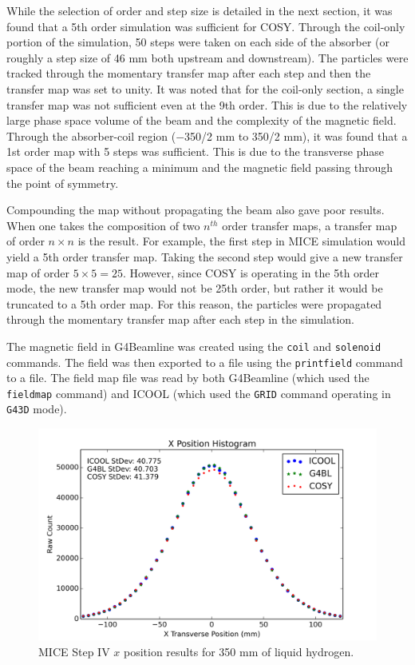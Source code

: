 While the selection of order and step size is detailed in the next section, it was found that a 5th order simulation was sufficient for COSY. Through the coil-only portion of the simulation, 50 steps were taken on each side of the absorber (or roughly a step size of 46 mm both upstream and downstream). The particles were tracked through the momentary transfer map after each step and then the transfer map was set to unity. It was noted that for the coil-only section, a single transfer map was not sufficient even at the 9th order. This is due to the relatively large phase space volume of the beam and the complexity of the magnetic field. Through the absorber-coil region ($-$350/2 mm to 350/2 mm), it was found that a 1st order map with 5 steps was sufficient. This is due to the transverse phase space of the beam reaching a minimum and the magnetic field passing through the point of symmetry.

Compounding the map without propagating the beam also gave poor results. When one takes the composition of two $n^{th}$ order transfer maps, a transfer map of order $n\times n$ is the result. For example, the first step in MICE simulation would yield a 5th order transfer map. Taking the second step would give a new transfer map of order $5\times 5 = 25$. However, since COSY is operating in the 5th order mode, the new transfer map would not be 25th order, but rather it would be truncated to a 5th order map. For this reason, the particles were propagated through the momentary transfer map after each step in the simulation.

The magnetic field in G4Beamline was created using the \texttt{coil} and \texttt{solenoid} commands. The field was then exported to a file using the \texttt{printfield} command to a file. The field map file was read by both G4Beamline (which used the \texttt{fieldmap} command) and ICOOL (which used the \texttt{GRID} command operating in \texttt{G43D} mode).

\begin{figure}[H]
  \centering
    \includegraphics[width=\textwidth]{MICE data/x} 
  \caption{MICE Step IV $x$ position results for 350 mm of liquid hydrogen.}
  \label{fig:micex}
\end{figure}

